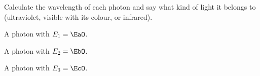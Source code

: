 Calculate the wavelength of each photon and say what kind of light it belongs to (ultraviolet, visible with its colour, or infrared).

\begin{abcliste}
\abc A photon with $E_1 = \EaO$.

\abc A photon with $E_2 = \EbO$.

\abc A photon with $E_3 = \EcO$.
\end{abcliste}
